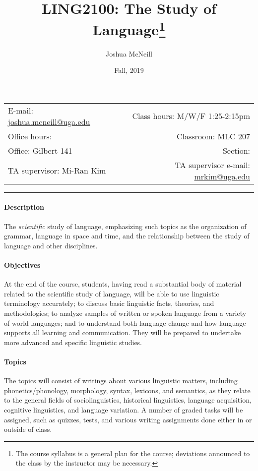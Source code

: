 \documentclass{article}
\title{LING2100: The Study of Language\footnote{The course syllabus is a general plan for the course; deviations announced to the class by the instructor may be necessary.}}
\author{Joshua McNeill}
\date{Fall, 2019}
\begin{document}
  \maketitle

  \begin{center}
    \begin{tabular}{@{} l r @{}}
      E-mail: \url{joshua.mcneill@uga.edu} & Class hours: M/W/F 1:25-2:15pm\\
      Office hours: & Classroom: MLC 207\\
      Office: Gilbert 141 & Section:\\
      TA supervisor: Mi-Ran Kim & TA supervisor e-mail: \url{mrkim@uga.edu}
    \end{tabular}
  \end{center}

  \hrule

  \paragraph{Description}
    The \emph{scientific} study of language, emphasizing such topics as the organization of grammar, language in space and time, and the relationship between the study of language and other disciplines.

  \paragraph{Objectives}
    At the end of the course, students, having read a substantial body of material related to the scientific study of language, will be able to use linguistic terminology accurately; to discuss basic linguistic facts, theories, and methodologies; to analyze samples of written or spoken language from a variety of world languages; and to understand both language change and how language supports all learning and communication. They will be prepared to undertake more advanced and specific linguistic studies.

  \paragraph{Topics}
    The topics will consist of writings about various linguistic matters, including phonetics/phonology, morphology, syntax, lexicons, and semantics, as they relate to the general fields of sociolinguistics, historical linguistics, language acquisition, cognitive linguistics, and language variation. A number of graded tasks will be assigned, such as quizzes, tests, and various writing assignments done either in or outside of class.
\end{document}
